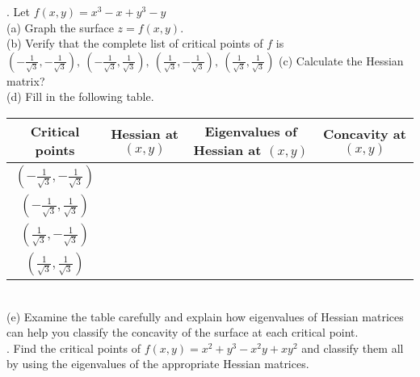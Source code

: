 \documentclass{article} %
\begin{document}
{    . Let $ f(x, y) = x^3 - x + y^3 - y $ \\
    (a) Graph the surface $ z = f(x, y) $. \\
    (b) Verify that the complete list of critical points of $ f $ is
    \( %
    \left(-\frac{1}{\sqrt{3}}, -\frac{1}{\sqrt{3}}\right),\ %
    \left(-\frac{1}{\sqrt{3}}, \frac{1}{\sqrt{3}}\right),\ 
    \left(\frac{1}{\sqrt{3}}, -\frac{1}{\sqrt{3}}\right),\ 
    \left(\frac{1}{\sqrt{3}}, \frac{1}{\sqrt{3}}\right)
    \)
    (c) Calculate the Hessian matrix? \\
    (d) Fill in the following table. \\
    \begin{tabular}{|c|c|c|c|}
        \hline
        Critical points & Hessian at $ (x, y) $ & Eigenvalues of Hessian at $ (x, y) $ & Concavity at $ (x, y) $ \\
        \hline
        $ \left(-\frac{1}{\sqrt{3}}, -\frac{1}{\sqrt{3}}\right) $ & & & \\
        \hline
        $ \left(-\frac{1}{\sqrt{3}}, \frac{1}{\sqrt{3}}\right) $ & & & \\
        \hline
        $ \left(\frac{1}{\sqrt{3}}, -\frac{1}{\sqrt{3}}\right) $ & & & \\
        \hline
        $ \left(\frac{1}{\sqrt{3}}, \frac{1}{\sqrt{3}}\right) $ & & & \\
        \hline
    \end{tabular} \\
    (e) Examine the table carefully and explain how eigenvalues of Hessian matrices can help you classify
    the concavity of the surface at each critical point. \\

    . Find the critical points of $ f(x, y) = x^2 + y^3 - x^2y + xy^2 $ and classify them all by using the eigenvalues
    of the appropriate Hessian matrices.

}   
\end{document}
